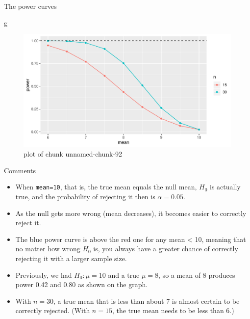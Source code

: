 \documentclass[
  ignorenonframetext,
]{beamer}
\newenvironment{Shaded}{\begin{snugshade}}{\end{snugshade}}
\newcommand{\NormalTok}[1]{#1}
\providecommand{\tightlist}{%
  \setlength{\itemsep}{0pt}\setlength{\parskip}{0pt}}
\begin{document}
\begin{frame}[fragile]{The power curves}
\protect\hypertarget{the-power-curves}{}

\begin{Shaded}
\begin{Highlighting}[]
\NormalTok{g}
\end{Highlighting}
\end{Shaded}

\begin{figure}
\centering
\includegraphics{figure/unnamed-chunk-92-1.pdf}
\caption{plot of chunk unnamed-chunk-92}
\end{figure}

\end{frame}

\begin{frame}[fragile]{Comments}
\protect\hypertarget{comments-3}{}

\begin{itemize}
\tightlist
\item
  When \texttt{mean=10}, that is, the true mean equals the null mean,
  \(H_0\) is actually true, and the probability of rejecting it then is
  \(\alpha = 0.05\).
\item
  As the null gets more wrong (mean decreases), it becomes easier to
  correctly reject it.
\item
  The blue power curve is above the red one for any mean \textless{} 10,
  meaning that no matter how wrong \(H_0\) is, you always have a greater
  chance of correctly rejecting it with a larger sample size.
\item
  Previously, we had \(H_0 : \mu = 10\) and a true \(\mu = 8\), so a
  mean of 8 produces power 0.42 and 0.80 as shown on the graph.
\item
  With \(n = 30\), a true mean that is less than about 7 is almost
  certain to be correctly rejected. (With \(n = 15\), the true mean
  needs to be less than 6.)
\end{itemize}

\end{frame}
\end{document}
